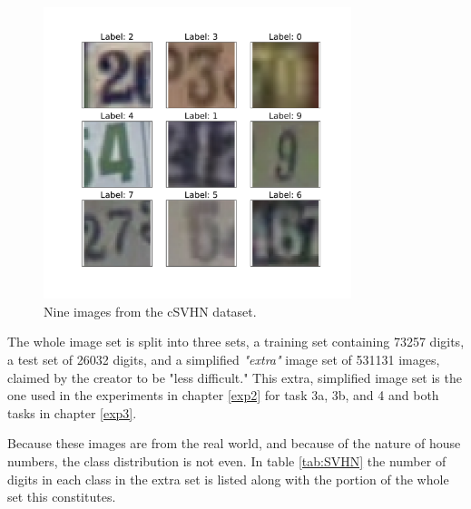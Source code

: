 \begin{figure}[p!]
    \centering
    \includegraphics[width=0.8\textwidth]{Chapters/3.Implementation/figures/cSVHN.pdf}
    \caption[cSVHN example]{Nine images from the cSVHN dataset.}
    \label{fig:csvhn}
\end{figure}

The whole image set is split into three sets, a training set containing 73257 digits, a test set of 26032 digits, and a simplified \textit{"extra"} image set of 531131 images, claimed by the creator to be "less difficult." This extra, simplified image set is the one used in the experiments in chapter \ref{exp2} for task 3a, 3b, and 4 and both tasks in chapter \ref{exp3}.



Because these images are from the real world, and because of the nature of house numbers, the class distribution is not even. In table \ref{tab:SVHN} the number of digits in each class in the extra set is listed along with the portion of the whole set this constitutes.  
